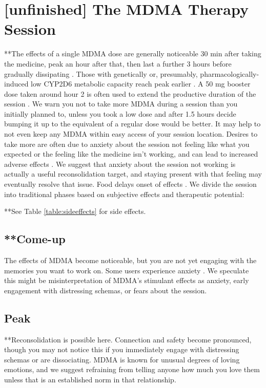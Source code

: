 \documentclass[12pt,letterpaper]{book}
\begin{document}
\section{[unfinished] The MDMA Therapy Session}
\label{session}
**The effects of a single MDMA dose are generally noticeable 30 min after taking the medicine, peak an hour after that, then last a further 3 hours before gradually dissipating \cite{vizeliActuteEffects}. Those with genetically or, presumably, pharmacologically-induced low CYP2D6 metabolic capacity reach peak earlier \cite{schmid2016cyp2d6}. A 50 mg booster dose taken around hour 2 is often used to extend the productive duration of the session \cite{liechtiInteractions}. We warn you not to take more MDMA during a session than you initially planned to, unless you took a low dose and after 1.5 hours decide bumping it up to the equivalent of a regular dose would be better. It may help to not even keep any MDMA within easy access of your session location. Desires to take more are often due to anxiety about the session not feeling like what you expected or the feeling like the medicine isn't working, and can lead to increased adverse effects \cite{bruntLinking}. We suggest that anxiety about the session not working is actually a useful reconsolidation target, and staying present with that feeling may eventually resolve that issue. Food delays onset of effects \cite{MithoeferMDMA}. We divide the session into traditional phases based on subjective effects and therapeutic potential:

**See Table \ref{table:sideeffects} for side effects.

\subsection*{**Come-up}
The effects of MDMA become noticeable, but you are not yet engaging with the memories you want to work on. Some users experience anxiety \cite{hillsSolo}. We speculate this might be misinterpretation of MDMA's stimulant effects as anxiety, early engagement with distressing schemas, or fears about the session.

\subsection*{Peak}
**Reconsolidation is possible here. Connection and safety become pronounced, though you may not notice this if you immediately engage with distressing schemas or are dissociating. MDMA is known for unusual degrees of loving emotions, and we suggest refraining from telling anyone how much you love them unless that is an established norm in that relationship.
\end{document}
